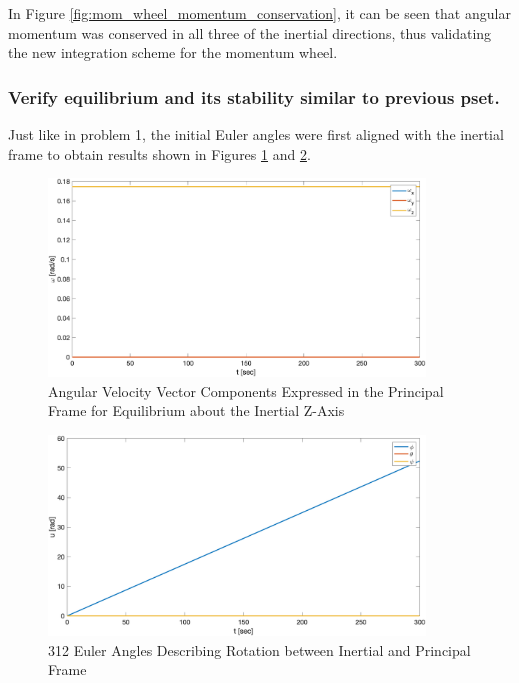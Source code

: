 In Figure \ref{fig:mom_wheel_momentum_conservation}, it can be seen that angular momentum was conserved in all three of the inertial directions, thus validating the new integration scheme for the momentum wheel.

\subsubsection{Verify equilibrium and its stability similar to previous pset.}

Just like in problem 1, the initial Euler angles were first aligned with the inertial frame to obtain results shown in Figures \ref{fig:mom_wheel_inertial_equilibrium} and \ref{fig:mom_wheel_equilibrium_inertial_angles}.

\begin{figure}[H]
    \centering
    \captionsetup{justification = centering}
    \includegraphics[width = 10cm]{Images/PS4/mom_wheel_equilibrium_inertial_velocities.png}
    \caption{Angular Velocity Vector Components Expressed in the Principal Frame for Equilibrium about the Inertial Z-Axis}
    \label{fig:mom_wheel_inertial_equilibrium}
\end{figure}

\begin{figure}[H]
    \centering
    \captionsetup{justification = centering}
    \includegraphics[width = 10cm]{Images/PS4/mom_wheel_equilibrium_inertial_angles.png}
    \caption{312 Euler Angles Describing Rotation between Inertial and Principal Frame}
    \label{fig:mom_wheel_equilibrium_inertial_angles}
\end{figure}

